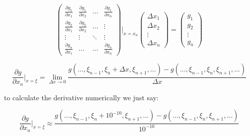 \documentclass[10pt,a4paper]{article}
\begin{document}
$$\begin{pmatrix}
\frac{\partial g_1}{\partial x_1}&\frac{\partial g_1}{\partial x_2} &\dots&\frac{\partial g_1}{\partial x_n}\\
\frac{\partial g_2}{\partial x_1}&\frac{\partial g_2}{\partial x_2}&\dots&\vdots\\
\vdots&\vdots&\ddots&\vdots\\
\frac{\partial g_n}{\partial x_1}&\dots&\dots&\frac{\partial g_n}{\partial x_n}
\end{pmatrix}\vert_{x=x_n}^{}  \begin{pmatrix}
\Delta x_1\\
\Delta x_2\\
\vdots\\
\Delta x_n
\end{pmatrix} = \begin{pmatrix}
g_1\\
g_2\\
\vdots\\
g_n
\end{pmatrix}$$


$$\frac{\partial g}{\partial x_n} \vert_{x=\xi}^{} = \lim_{\Delta x \to 0} \frac{g(\dots,\xi_{n-1},\xi_{n}+\Delta x,\xi_{n+1},\dots ) - g(\dots,\xi_{n-1},\xi_{n},\xi_{n+1},\dots )}{\Delta x}$$

to calculate the derivative numerically
we just say:

$$\frac{\partial g}{\partial x_n} \vert_{x=\xi}^{} \approx  \frac{g(\dots,\xi_{n-1},\xi_{n}+10^{-10},\xi_{n+1},\dots ) - g(\dots,\xi_{n-1},\xi_{n},\xi_{n+1},\dots )}{10^{-10}}$$
\end{document}
